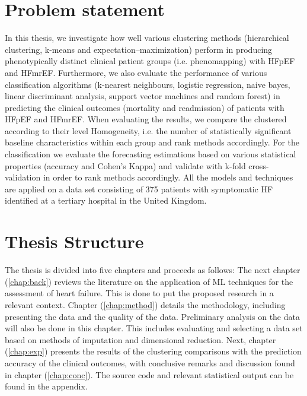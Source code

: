 \documentclass[../thesis.tex]{subfiles}
\begin{document}
\section{Problem statement}
\label{sec:prob_stat}

\noindent In this thesis, we investigate how well various clustering methods (hierarchical clustering, k-means and expectation–maximization) perform in producing phenotypically distinct clinical patient groups (i.e. phenomapping) with HFpEF and HFmrEF. Furthermore, we also evaluate the performance of various classification algorithms (k-nearest neighbours, logistic regression, naive bayes, linear discriminant analysis, support vector machines and random forest) in predicting the clinical outcomes (mortality and readmission) of patients with HFpEF and HFmrEF. When evaluating the results, we compare the clustered according to their level Homogeneity, i.e. the number of statistically significant baseline characteristics within each group and rank methods accordingly. For the classification we evaluate the forecasting estimations based on various statistical properties (accuracy and Cohen's Kappa) and validate with k-fold cross-validation in order to rank methods accordingly. All the models and techniques are applied on a data set consisting of 375 patients with symptomatic HF identified at a tertiary hospital in the United Kingdom.  

\section{Thesis Structure}
\label{sec:thesis_struc}

\noindent The thesis is divided into five chapters and proceeds as follows: The next chapter (\ref{chap:back}) reviews the literature on the application of ML techniques for the assessment of heart failure. This is done to put the proposed research in a relevant context. Chapter (\ref{chap:method}) details the methodology, including presenting the data and the quality of the data. Preliminary analysis on the data will also be done in this chapter. This includes evaluating and selecting a data set based on methods of imputation and dimensional reduction. Next, chapter (\ref{chap:exp}) presents the results of the clustering comparisons with the prediction accuracy of the clinical outcomes, with conclusive remarks and discussion found in chapter (\ref{chap:conc}). The source code and relevant statistical output can be found in the appendix.
\end{document}
